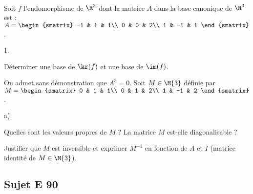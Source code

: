 \documentclass[11pt]{article}
\begin{document}

\begin{exerciceSP}~\\
Soit $f$ l'endomorphisme de $\R^3$ dont la matrice $A$ dans la base 
canonique de $\R^3$ est : $A=
\begin{smatrix}
  -1 & 1 & 1\\ 
  0 & 0 & 2\\ 
  1 & -1 & 1
\end{smatrix}$.
\begin{noliste}{1.}
    \setlength{\itemsep}{2mm}
  \item Déterminer une base de $\kr(f)$ et une base de $\im(f)$.
  
  \item On admet sans démonstration que $A^3=0$. Soit $M\in\M{3}$ 
  définie par $M=
  \begin{smatrix}
    0 & 1 & 1\\ 
    0 & 1 & 2\\ 
    1 & -1 & 2
  \end{smatrix}$.
  \begin{noliste}{a)}
    \setlength{\itemsep}{2mm}
    \item Quelles sont les valeurs propres de $M$ ? La matrice $M$ 
    est-elle diagonalisable ?
    
    \item Justifier que $M$ est inversible et exprimer $M^{-1}$ en 
    fonction de $A$ et $I$ (matrice identité de $M\in\M{3}$).
  \end{noliste}
\end{noliste}
\end{exerciceSP}






\subsection*{Sujet E 90}

\end{document}
